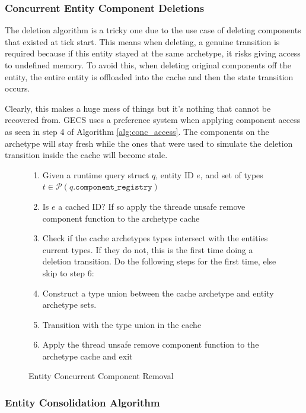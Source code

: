 \subsubsection{Concurrent Entity Component Deletions}
The deletion algorithm is a tricky one due to the use case of deleting components that existed at tick start. This means when deleting, a genuine transition is required because if this entity stayed at the same archetype, it risks giving access to undefined memory. To avoid this, when deleting original components off the entity, the entire entity is offloaded into the cache and then the state transition occurs. 

Clearly, this makes a huge mess of things but it's nothing that cannot be recovered from. GECS uses a preference system when applying component access as seen in step 4 of Algorithm \ref{alg:conc_access}. The components on the archetype will stay fresh while the ones that were used to simulate the deletion transition inside the cache will become stale. 

\begin{figure}[htbp]
    \begin{enumerate}
        \item Given a runtime query struct $q$, entity ID $e$, and set of types $t \in \mathcal{P}(q.\texttt{component\_registry})$
        \item Is $e$ a cached ID? If so  apply the threade unsafe remove component function to the archetype cache
        \item Check if the cache archetypes types intersect with the entities current types. If they do not, this is the first time doing a deletion transition. Do the following steps for the first time, else skip to step 6:
        \item Construct a type union between the cache archetype and entity archetype sets. 
        \item Transition with the type union in the cache
        \item Apply the thread unsafe remove component function to the archetype cache and exit
\end{enumerate}
\caption{Entity Concurrent Component Removal}
\label{alg:conc_rem}
\end{figure}

\subsubsection{Entity Consolidation Algorithm}

